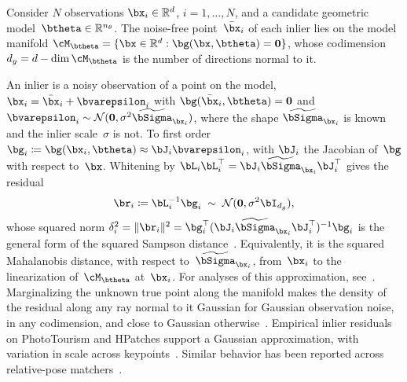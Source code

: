 \documentclass[10pt,twocolumn,letterpaper]{article}
\newcommand{\bzero}{\mathbf{0}}             %
\newcommand{\btSigma}{\widetilde{\bSigma}}  %
\newcommand{\NN}{\mathcal{N}}               %
\newcommand{\Reals}{\mathbb{R}}
\begin{document}
\label{sec:model}

Consider $N$ observations $\bx_i \in \Reals^d$, $i = 1,\ldots,N$, and
a candidate geometric model~$\btheta \in \Reals^{n_\theta}$. The
noise-free point~$\bar\bx_i$ of each inlier lies on the model manifold
$\cM_{\btheta} = \{\bx \in \Reals^d : \bg(\bx,\btheta) = \bzero\}$,
whose codimension $d_g = d - \dim\cM_{\btheta}$ is the number of
directions normal to it.

An inlier is a noisy observation of a point on the model,
$\bx_i = \bar\bx_i + \bvarepsilon_i$ with $\bg(\bar\bx_i,\btheta) = \bzero$
and $\bvarepsilon_i \sim \NN(\bzero, \sigma^2\btSigma_{\bx_i})$, where the
shape $\btSigma_{\bx_i}$ is known and the inlier scale~$\sigma$ is
not. To first order $\bg_i \coloneqq \bg(\bx_i,\btheta) \approx
\bJ_i\bvarepsilon_i$, with $\bJ_i$ the Jacobian of~$\bg$ with respect
to~$\bx$. Whitening by $\bL_i\bL_i^\top = \bJ_i\btSigma_{\bx_i}\bJ_i^\top$
gives the residual
\begin{equation}
 \br_i \coloneqq \bL_i^{-1}\bg_i \;\sim\; \NN(\bzero, \sigma^2\bI_{d_g}),
 \label{eq:residual}
\end{equation}
whose squared norm $\delta_i^2 = \|\br_i\|^2 =
\bg_i^\top(\bJ_i\btSigma_{\bx_i}\bJ_i^\top)^{-1}\bg_i$ is the general
form of the squared Sampson
distance~\cite{Sampson1982,Hartley2003,Chojnacki2000}. Equivalently,
it is the squared Mahalanobis distance, with respect
to~$\btSigma_{\bx_i}$, from~$\bx_i$ to the linearization
of~$\cM_{\btheta}$ at~$\bx_i$. For analyses of this approximation,
see~\cite{Harker2006,Rydell2024}. Marginalizing the unknown true point
along the manifold makes the density of the residual along any ray
normal to it Gaussian for Gaussian observation noise, in any codimension,
and close to Gaussian otherwise~\cite[Sec.~3.2]{Shekhovtsov2025}.
Empirical inlier residuals on
PhotoTourism and HPatches support a Gaussian approximation, with
variation in scale across keypoints~\cite[Fig.~3]{Shekhovtsov2025}.
Similar behavior has been reported across relative-pose
matchers~\cite{Edstedt2025}.
\end{document}
